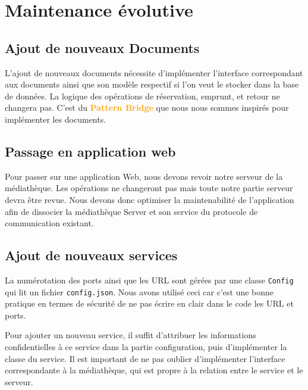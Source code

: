 \chapter{Maintenance évolutive}


\section{Ajout de nouveaux Documents}

L’ajout de nouveaux documents nécessite d’implémenter l’interface correspondant aux documents ainsi que son modèle respectif si l'on veut le stocker dans la base de données. La logique des opérations de réservation, emprunt, et retour ne changera pas. C’est du \textbf{\textcolor{orange}{Pattern Bridge}} que nous nous sommes inspirés pour implémenter les documents.


\section{Passage en application web}

Pour passer sur une application Web, nous devons revoir notre serveur de la médiathèque. Les opérations ne changeront pas mais toute notre partie serveur devra être revue. Nous devons donc optimiser la maintenabilité de l’application afin de dissocier la médiathèque Server et son service du protocole de communication existant.


\section{Ajout de nouveaux services}

La numérotation des ports ainsi que les URL sont gérées par une classe \texttt{Config} qui lit un fichier \texttt{config.json}. Nous avons utilisé ceci car c’est une bonne pratique en termes de sécurité de ne pas écrire en clair dans le code les URL et ports.

Pour ajouter un nouveau service, il suffit d'attribuer les informations confidentielles à ce service dans la partie configuration, puis d'implémenter la classe du service. Il est important de ne pas oublier d'implémenter l'interface correspondante à la médiathèque, qui est propre à la relation entre le service et le serveur.
